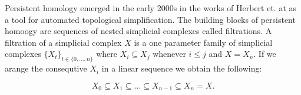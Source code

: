 Persistent homology emerged in the early 2000s in the works of Herbert et. at \cite{persistence-original} as a tool for automated topological simplification. The building blocks of persistent homoogy are sequences of nested simplicial complexes called filtrations. A filtration of a simplicial complex $X$ is a one parameter family of simplicial complexes $\{X_t\}_{t \in \{0, ..., n\}}$ where $X_i \subseteq X_j$ whenever $i \le j$ and $X = X_n$. If we arange the consequtive $X_i$ in a linear sequence we obtain the following:


$$ X_0 \subseteq X_1 \subseteq ... \subseteq X_{n-1} \subseteq X_n = X. $$

